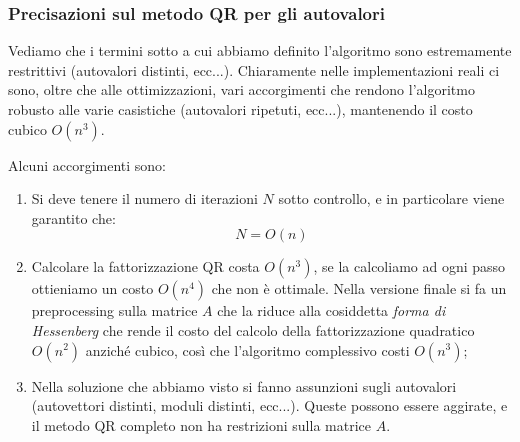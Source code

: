 \documentclass[a4paper,11pt]{article}
\begin{document}
\subsubsection{Precisazioni sul metodo QR per gli autovalori}
Vediamo che i termini sotto a cui abbiamo definito l'algoritmo sono estremamente restrittivi (autovalori distinti, ecc...).
Chiaramente nelle implementazioni reali ci sono, oltre che alle ottimizzazioni, vari accorgimenti che rendono l'algoritmo robusto alle varie casistiche (autovalori ripetuti, ecc...), mantenendo il costo cubico $O(n^3)$.

Alcuni accorgimenti sono:
\begin{enumerate}
	\item Si deve tenere il numero di iterazioni $N$ sotto controllo, e in particolare viene garantito che:
		$$
		N = O(n)
		$$
	\item Calcolare la fattorizzazione QR costa $O(n^3)$, se la calcoliamo ad ogni passo ottieniamo un costo $O(n^4)$ che non è ottimale.
		Nella versione finale si fa un preprocessing sulla matrice $A$ che la riduce alla cosiddetta \textit{forma di Hessenberg} che rende il costo del calcolo della fattorizzazione quadratico $O(n^2)$ anziché cubico, così che l'algoritmo complessivo costi $O(n^3)$;
	\item Nella soluzione che abbiamo visto si fanno assunzioni sugli autovalori (autovettori distinti, moduli distinti, ecc...). Queste possono essere aggirate, e il metodo QR completo non ha restrizioni sulla matrice $A$.
\end{enumerate}
\end{document}
